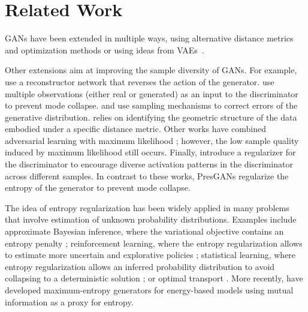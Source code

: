 \documentclass[11pt]{article}
\begin{document}
\section{Related Work}
\label{sec:related}

\glspl{GAN} \citep{goodfellow2014generative} have been extended in multiple ways, using alternative distance metrics and optimization methods \citep[see, e.g.,][]{li2015generative,dziugaite2015training,nowozin2016f,arjovsky2017wasserstein,ravuri2018learning,genevay2017learning} or using ideas from \glspl{VAE}~\citep{makhzani2015adversarial, mescheder2017adversarial, dumoulin2016adversarially, donahue2016adversarial, tolstikhin2017wasserstein, ulyanov2018takes, rosca2017variational}.

Other extensions aim at improving the sample diversity of \glspl{GAN}. For example, \citet{srivastava2017veegan} 
use a reconstructor network that reverses the action of the generator. \citet{lin2018pacgan} use multiple observations (either real or generated) as an input to the discriminator to prevent mode collapse. \citet{azadi2018discriminator} and \citet{turner2018metropolis} use sampling mechanisms to correct errors of the generative distribution. \citet{xiao2018bourgan} relies on identifying the geometric structure of the data embodied under a specific distance metric.
Other works have combined adversarial learning with maximum likelihood \citep{grover2018flow, yin2019semi}; however, the low sample quality induced by maximum likelihood still occurs. Finally, \citet{cao2018improving} introduce a regularizer for the discriminator to encourage diverse activation patterns in the discriminator across different samples. 
In contrast to these works, Pres\glspl{GAN} regularize the entropy of the generator to prevent mode collapse. 

The idea of entropy regularization has been widely applied in many problems that involve estimation of unknown probability distributions. Examples include approximate Bayesian inference, where the variational objective contains an entropy penalty \citep{jordan1998learning,bishop2006pattern,wainwright2008graphical,blei2017variational}; reinforcement learning, where the entropy regularization allows to estimate more uncertain and explorative policies \citep{schulman2015trust, mnih2016asynchronous}; statistical learning, where entropy regularization allows an inferred probability distribution to  avoid collapsing to a deterministic solution \citep{freund1997decision, soofi2000principal, jaynes2003probability}; or optimal transport \citep{rigollet2018entropic}. More recently, \citet{kumar2019maximum} have developed maximum-entropy generators for energy-based models using mutual information as a proxy for entropy. 
\end{document}
